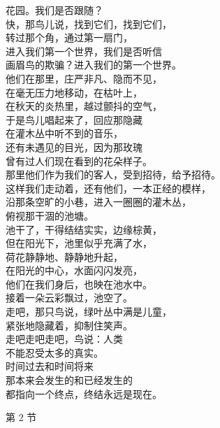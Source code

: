 \documentclass{article}
\begin{document}
花园。我们是否跟随？ \\
快，那鸟儿说，找到它们，找到它们， \\
转过那个角，通过第一扇门， \\
进入我们第一个世界，我们是否听信 \\
画眉鸟的欺骗？进入我们的第一个世界。 \\
他们在那里，庄严非凡、隐而不见， \\
在毫无压力地移动，在枯叶上， \\
在秋天的炎热里，越过颤抖的空气， \\
于是鸟儿唱起来了，回应那隐藏 \\
在灌木丛中听不到的音乐， \\
还有未遇见的目光，因为那玫瑰 \\
曾有过人们现在看到的花朵样子。 \\
那里他们作为我们的客人，受到招待，给予招待。 \\
这样我们走动着，还有他们，一本正经的模样， \\
沿那条空旷的小巷，进入一圈圈的灌木丛， \\
俯视那干涸的池塘。 \\
池干了，干得结结实实，边缘棕黄， \\
但在阳光下，池里似乎充满了水， \\
荷花静静地、静静地升起， \\
在阳光的中心，水面闪闪发亮， \\
他们在我们身后，也映在池水中。 \\
接着一朵云彩飘过，池空了。 \\
走吧，那只鸟说，绿叶丛中满是儿童， \\
紧张地隐藏着，抑制住笑声。 \\
走吧走吧走吧，鸟说：人类 \\
不能忍受太多的真实。 \\
时间过去和时间将来 \\
那本来会发生的和已经发生的 \\
都指向一个终点，终结永远是现在。

第 2 节

\newpage 
\end{document}
